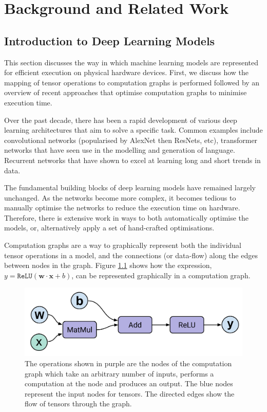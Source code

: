 \chapter{Background and Related Work}

\section{Introduction to Deep Learning Models}
This section discusses the way in which machine learning models are represented for efficient execution on physical hardware devices. First, we discuss how the mapping of tensor operations to computation graphs is performed followed by an overview of recent approaches that optimise computation graphs to minimise execution time.

Over the past decade, there has been a rapid development of various deep learning architectures that aim to solve a specific task. Common examples include convolutional networks (popularised by AlexNet then ResNets, etc), transformer networks that have seen use in the modelling and generation of language. Recurrent networks that have shown to excel at learning long and short trends in data.

The fundamental building blocks of deep learning models have remained largely unchanged.  As the networks become more complex, it becomes tedious to manually optimise the networks to reduce the execution time on hardware. Therefore, there is extensive work in ways to both automatically optimise the models, or, alternatively apply a set of hand-crafted optimisations.

Computation graphs are a way to graphically represent both the individual tensor operations in a model, and the connections (or data-flow) along the edges between nodes in the graph. Figure \ref{fig:bg:perceptron} shows how the expression, $y = \texttt{ReLU}(\mathbf{w} \cdot \mathbf{x} + b)$, can be represented graphically in a computation graph.

\begin{figure}[ht]
  \centering
  \includegraphics[width=0.75\columnwidth]{sections/2background/images/dataflow}
  \caption[Single perceptron as a computation graph]{The operations shown in purple are the nodes of the computation graph which take an arbitrary number of inputs, performs a computation at the node and produces an output. The blue nodes represent the input nodes for tensors. The directed edges show the flow of tensors through the graph.}
  \label{fig:bg:perceptron}
\end{figure}


